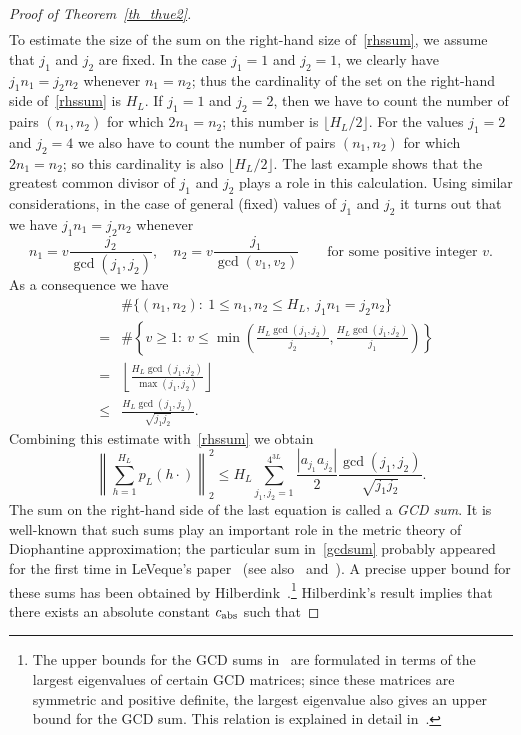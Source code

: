 \documentclass[12pt]{amsart}
\begin{document}
\begin{proof}[Proof of Theorem~\ref{th_thue2}]
\begin{eqnarray}
\end{eqnarray}
To estimate the size of the sum on the right-hand size of~\eqref{rhssum}, we assume that $j_1$ and $j_2$ are fixed. In the case $j_1=1$ and $j_2=1$, we clearly have $j_1 n_1 = j_2 n_2$ whenever $n_1 = n_2$; thus the cardinality of the set on the right-hand side of~\eqref{rhssum} is $H_L$. If $j_1=1$ and $j_2=2$, then we have to count the number of pairs $(n_1,n_2)$ for which $2 n_1 = n_2$; this number is $\lfloor H_L / 2 \rfloor$. For the values $j_1=2$ and $j_2=4$ we also have to count the number of pairs $(n_1,n_2)$ for which $2 n_1 = n_2$; so this cardinality is also $\lfloor H_L / 2 \rfloor$. The last example shows that the greatest common divisor of $j_1$ and $j_2$ plays a role in this calculation. Using similar considerations, in the case of general (fixed) values of $j_1$ and $j_2$ it turns out that we have $j_1 n_1 = j_2 n_2$ whenever
$$
n_1 = v \frac{j_2}{\gcd(j_1,j_2)}, \quad n_2 = v \frac{j_1}{\gcd(v_1,v_2)} \qquad \textrm{for some positive integer $v$}.
$$
As a consequence we have
\begin{eqnarray}
& & \# \Big\{ (n_1, n_2):~1 \leq n_1, n_2 \leq H_L, ~j_1 n_1 = j_2 n_2 \Big\} \nonumber\\
& = & \# \left\{v \geq 1:~ v \leq \min \left( \frac{H_L \gcd(j_1,j_2)}{j_2}, \frac{H_L \gcd(j_1,j_2)}{j_1} \right) \right\} \nonumber\\
& = & \left\lfloor \frac{H_L \gcd(j_1,j_2)}{\max(j_1,j_2)} \right\rfloor \nonumber\\
& \leq & \frac{H_L \gcd(j_1,j_2)}{\sqrt{j_1 j_2}}. \nonumber
\end{eqnarray}
Combining this estimate with~\eqref{rhssum} we obtain
\begin{equation} \label{gcdsum}
\left\| \sum_{h=1}^{H_L} p_L (h \cdot) \right\|_2^2 \leq H_L \sum_{j_1,j_2=1}^{4^{3L}} \frac{|a_{j_1} a_{j_2}|}{2} \frac{\gcd(j_1,j_2)}{\sqrt{j_1 j_2}}.
\end{equation}
The sum on the right-hand side of the last equation is called a \emph{GCD sum}. It is well-known that such sums play an important role in the metric theory of Diophantine approximation; the particular sum in~\eqref{gcdsum} probably appeared for the first time in LeVeque's paper~\cite{LeVe} (see also~\cite{dhs} and~\cite{abs}). A precise upper bound for these sums has been obtained by Hilberdink~\cite{hilber}.\footnote{The upper bounds for the GCD sums in~\cite{hilber} are formulated in terms of the largest eigenvalues of certain GCD matrices; since these matrices are symmetric and positive definite, the largest eigenvalue also gives an upper bound for the GCD sum. This relation is explained in detail in~\cite{absw}.} Hilberdink's result implies that there exists an absolute constant $c_{\textup{abs}}$ such that

\end{proof}
\end{document}
